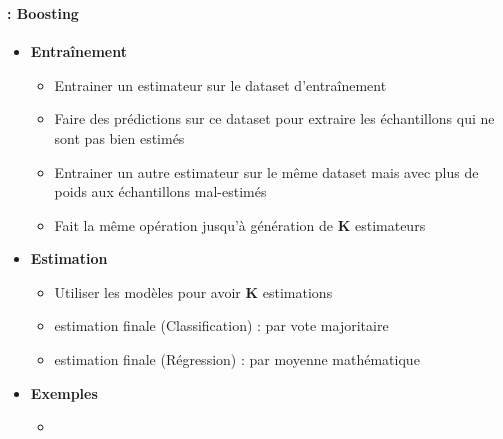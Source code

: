 \documentclass[xcolor=table]{beamer}
\begin{document}
\begin{frame}
	\frametitle{\insertsection}
	\framesubtitle{\insertsubsection: Boosting}
	
	\begin{itemize}
		\item \textbf{Entraînement}
		\begin{itemize}
			\item Entrainer un estimateur sur le dataset d'entraînement
			\item Faire des prédictions sur ce dataset pour extraire les échantillons qui ne sont pas bien estimés
			\item Entrainer un autre estimateur sur le même dataset mais avec plus de poids aux échantillons mal-estimés
			\item Fait la même opération jusqu'à génération de \textbf{K} estimateurs
		\end{itemize}
		\item \textbf{Estimation}
		\begin{itemize}
			\item Utiliser les modèles pour avoir \textbf{K} estimations
			\item estimation finale (Classification) : par vote majoritaire
			\item estimation finale (Régression) : par moyenne mathématique
		\end{itemize}
		\item \textbf{Exemples}
		\begin{itemize}
			\item {}
		\end{itemize}
	\end{itemize}
	
\end{frame}
\end{document}
